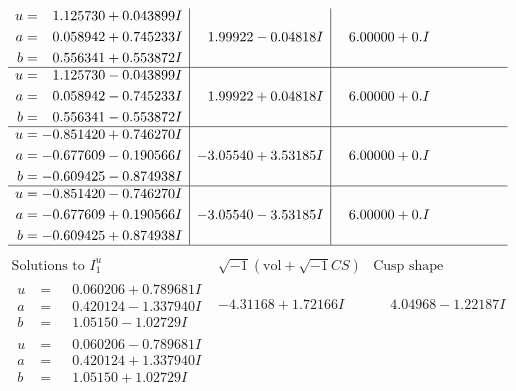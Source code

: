 \documentclass[1p]{elsarticle_modified}
\theoremstyle{definition}
\newcommand{\I}{\sqrt{-1}}
\begin{document}
$$\begin{array}{c|c|c}
\begin{aligned}
u &= \phantom{-}1.125730 + 0.043899 I \\
a &= \phantom{-}0.058942 + 0.745233 I \\
b &= \phantom{-}0.556341 + 0.553872 I\end{aligned}
 & \phantom{-}1.99922 - 0.04818 I & \phantom{-}6.00000 + 0. I\phantom{ +0.000000I} \\ \hline\begin{aligned}
u &= \phantom{-}1.125730 - 0.043899 I \\
a &= \phantom{-}0.058942 - 0.745233 I \\
b &= \phantom{-}0.556341 - 0.553872 I\end{aligned}
 & \phantom{-}1.99922 + 0.04818 I & \phantom{-}6.00000 + 0. I\phantom{ +0.000000I} \\ \hline\begin{aligned}
u &= -0.851420 + 0.746270 I \\
a &= -0.677609 - 0.190566 I \\
b &= -0.609425 - 0.874938 I\end{aligned}
 & -3.05540 + 3.53185 I & \phantom{-}6.00000 + 0. I\phantom{ +0.000000I} \\ \hline\begin{aligned}
u &= -0.851420 - 0.746270 I \\
a &= -0.677609 + 0.190566 I \\
b &= -0.609425 + 0.874938 I\end{aligned}
 & -3.05540 - 3.53185 I & \phantom{-}6.00000 + 0. I\phantom{ +0.000000I}\\
 \hline 
 \end{array}$$\newpage$$\begin{array}{c|c|c}  
\text{Solutions to }I^u_{1}& \I (\text{vol} + \sqrt{-1}CS) & \text{Cusp shape}\\
 \hline 
\begin{aligned}
u &= \phantom{-}0.060206 + 0.789681 I \\
a &= \phantom{-}0.420124 - 1.337940 I \\
b &= \phantom{-}1.05150 - 1.02729 I\end{aligned}
 & -4.31168 + 1.72166 I & \phantom{-}4.04968 - 1.22187 I \\ \hline\begin{aligned}
u &= \phantom{-}0.060206 - 0.789681 I \\
a &= \phantom{-}0.420124 + 1.337940 I \\
b &= \phantom{-}1.05150 + 1.02729 I\end{aligned}

\end{array}$$
\end{document}
